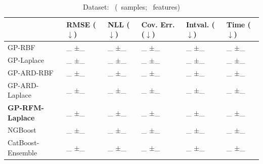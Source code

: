 {\begin{table}[htb]
		\centering
		\caption{Dataset: \lastdataset~(\lastsamples~samples; \lastfeatures~features)}
		\begin{tabular}{l||ll|ll|l}
			\toprule
			& RMSE ($\downarrow$) & NLL ($\downarrow$) & Cov. Err. ($\downarrow$) & Intval. ($\downarrow$) & Time ($\downarrow$) \\
			\midrule
			GP-RBF 			& \lastrmseA_ \scriptsize{$\pm$\lastrmseAstd_} & \lastnllA_ \scriptsize{$\pm$\lastnllAstd_} & \lastcovA_ \scriptsize{$\pm$\lastcovAstd_} & \lastintA_ \scriptsize{$\pm$\lastintAstd_} & \lasttimeA_ \scriptsize{$\pm$\lasttimeAstd_} \\
			GP-Laplace 		& \lastrmseB_ \scriptsize{$\pm$\lastrmseBstd_} & \lastnllB_ \scriptsize{$\pm$\lastnllBstd_} & \lastcovB_ \scriptsize{$\pm$\lastcovBstd_} & \lastintB_ \scriptsize{$\pm$\lastintBstd_} & \lasttimeB_ \scriptsize{$\pm$\lasttimeBstd_} \\
			\midrule
			GP-ARD-RBF 		& \lastrmseC_ \scriptsize{$\pm$\lastrmseCstd_} & \lastnllC_ \scriptsize{$\pm$\lastnllCstd_} & \lastcovC_ \scriptsize{$\pm$\lastcovCstd_} & \lastintC_ \scriptsize{$\pm$\lastintCstd_} & \lasttimeC_ \scriptsize{$\pm$\lasttimeCstd_} \\
			GP-ARD-Laplace 	& \lastrmseD_ \scriptsize{$\pm$\lastrmseDstd_} & \lastnllD_ \scriptsize{$\pm$\lastnllDstd_} & \lastcovD_ \scriptsize{$\pm$\lastcovDstd_} & \lastintD_ \scriptsize{$\pm$\lastintDstd_} & \lasttimeD_ \scriptsize{$\pm$\lasttimeDstd_} \\
			\midrule
			\textbf{GP-RFM-Laplace} 	& \lastrmseE_ \scriptsize{$\pm$\lastrmseEstd_} & \lastnllE_ \scriptsize{$\pm$\lastnllEstd_} & \lastcovE_ \scriptsize{$\pm$\lastcovEstd_} & \lastintE_ \scriptsize{$\pm$\lastintEstd_} & \lasttimeE_ \scriptsize{$\pm$\lasttimeEstd_} \\
			\midrule
			NGBoost 		& \lastrmseF_ \scriptsize{$\pm$\lastrmseFstd_} & \lastnllF_ \scriptsize{$\pm$\lastnllFstd_} & \lastcovF_ \scriptsize{$\pm$\lastcovFstd_} & \lastintF_ \scriptsize{$\pm$\lastintFstd_} & \lasttimeF_ \scriptsize{$\pm$\lasttimeFstd_} \\
			CatBoost-Ensemble 	& \lastrmseG_ \scriptsize{$\pm$\lastrmseGstd_} & \lastnllG_ \scriptsize{$\pm$\lastnllGstd_} & \lastcovG_ \scriptsize{$\pm$\lastcovGstd_} & \lastintG_ \scriptsize{$\pm$\lastintGstd_} & \lasttimeG_ \scriptsize{$\pm$\lasttimeGstd_} \\
			\bottomrule
		\end{tabular}
	\end{table}
}

